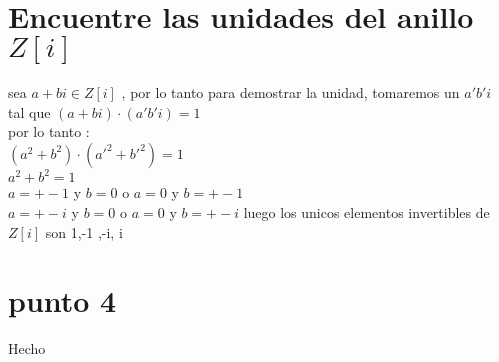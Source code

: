 \documentclass[10pt,a4paper]{article} %
\begin{document}
            \section{Encuentre las unidades del anillo $ Z[i]  $  }
            sea $ a+bi \in Z[i]  $  , por lo tanto para demostrar la unidad,
            tomaremos un $ a' b'i  $  tal que $ (a+bi) \cdot (a' b'i) =1  $
            \\
            por lo tanto :
            \\
            $ (a ^{2}  + b ^{2} ) \cdot (a' ^{2} + b' ^{2}  ) = 1  $
            \\
            $ a ^{2} + b ^{2 } = 1    $
            \\
            $ a = +- 1  $  y  $ b=0  $  o $ a = 0   $ y $ b = +-1  $
            \\
            $ a = +- i  $  y  $ b=0  $  o $ a = 0   $ y $ b = +-i  $
            luego los unicos elementos invertibles de $ Z[i]  $ son 1,-1 ,-i, i

            \section{punto 4 }
                Hecho























    \nocite{*}
    
    
\end{document}
